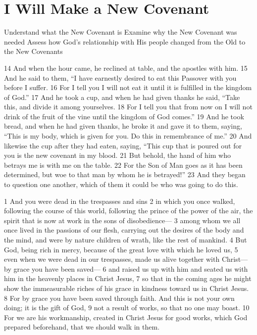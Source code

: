 \chapter{I Will Make a New Covenant}

\begin{goals}
\goal Understand what the New Covenant is
\goal Examine why the New Covenant was needed
\goal Assess how God's relationship with His people changed from the Old to the New Covenants
\end{goals}

\begin{bible}


14 And when the hour came, he reclined at table, and the apostles with him. 15 And he said to them, ``I have earnestly desired to eat this Passover with you before I suffer. 16 For I tell you I will not eat it until it is fulfilled in the kingdom of God.'' 17 And he took a cup, and when he had given thanks he said, ``Take this, and divide it among yourselves. 18 For I tell you that from now on I will not drink of the fruit of the vine until the kingdom of God comes.'' 19 And he took bread, and when he had given thanks, he broke it and gave it to them, saying, ``This is my body, which is given for you. Do this in remembrance of me.'' 20 And likewise the cup after they had eaten, saying, ``This cup that is poured out for you is the new covenant in my blood. 21 But behold, the hand of him who betrays me is with me on the table. 22 For the Son of Man goes as it has been determined, but woe to that man by whom he is betrayed!'' 23 And they began to question one another, which of them it could be who was going to do this.


1 And you were dead in the trespasses and sins 2 in which you once walked, following the course of this world, following the prince of the power of the air, the spirit that is now at work in the sons of disobedience— 3 among whom we all once lived in the passions of our flesh, carrying out the desires of the body and the mind, and were by nature children of wrath, like the rest of mankind. 4 But God, being rich in mercy, because of the great love with which he loved us, 5 even when we were dead in our trespasses, made us alive together with Christ—by grace you have been saved— 6 and raised us up with him and seated us with him in the heavenly places in Christ Jesus, 7 so that in the coming ages he might show the immeasurable riches of his grace in kindness toward us in Christ Jesus. 8 For by grace you have been saved through faith. And this is not your own doing; it is the gift of God, 9 not a result of works, so that no one may boast. 10 For we are his workmanship, created in Christ Jesus for good works, which God prepared beforehand, that we should walk in them.


\end{bible}
